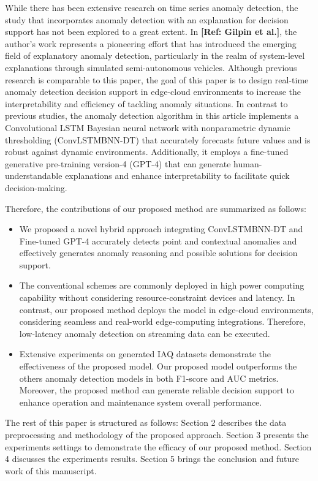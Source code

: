\documentclass[final,3p,times,twocolumn]{elsarticle}
\begin{document}
While there has been extensive research on time series anomaly detection, the study that incorporates anomaly detection with an explanation for decision support has not been explored to a great extent. In \textbf{[Ref: Gilpin et al.]}, the author’s work represents a pioneering effort that has introduced the emerging field of explanatory anomaly detection, particularly in the realm of system-level explanations through simulated semi-autonomous vehicles. Although previous research is comparable to this paper, the goal of this paper is to design real-time anomaly detection decision support in edge-cloud environments to increase the interpretability and efficiency of tackling anomaly situations. In contrast to previous studies, the anomaly detection algorithm in this article implements a Convolutional LSTM Bayesian neural network with nonparametric dynamic thresholding (ConvLSTMBNN-DT) that accurately forecasts future values and is robust against dynamic environments. Additionally, it employs a fine-tuned generative pre-training version-4 (GPT-4) that can generate human-understandable explanations and enhance interpretability to facilitate quick decision-making.

Therefore, the contributions of our proposed method are summarized as follows:
\begin{itemize}
\itemsep-0.25em 
\item We proposed a novel hybrid approach integrating ConvLSTMBNN-DT and Fine-tuned GPT-4 accurately detects point and contextual anomalies and effectively generates anomaly reasoning and possible solutions for decision support.
\item The conventional schemes are commonly deployed in high power computing capability without considering resource-constraint devices and latency. In contrast, our proposed method deploys the model in edge-cloud environments, considering seamless and real-world edge-computing integrations. Therefore, low-latency anomaly detection on streaming data can be executed.
\item Extensive experiments on generated IAQ datasets demonstrate the effectiveness of the proposed model. Our proposed model outperforms the others anomaly detection models in both F1-score and AUC metrics. Moreover, the proposed method can generate reliable decision support to enhance operation and maintenance system overall performance.
\end{itemize}

The rest of this paper is structured as follows: Section 2 describes the data preprocessing and methodology of the proposed approach. Section 3 presents the experiments settings to demonstrate the efficacy of our proposed method. Section 4 discusses the experiments results. Section 5 brings the conclusion and future work of this manuscript.
\end{document}
